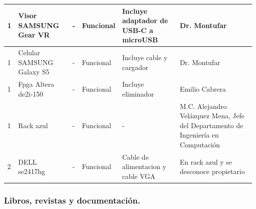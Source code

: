 \documentclass[a4paper,11pt]{article}                 %
\begin{document}
\begin{longtable}{|p{}|p{}|p{}|p{}|p{}|p{}|}
1                          & Visor SAMSUNG Gear VR                     & -                                                                            & Funcional                & Incluye adaptador de USB-C a microUSB                                      & Dr. Montufar                                                                      \\ \hline


1                          & Celular SAMSUNG Galaxy S5                 & -                                                                            & Funcional                & Incluye cable y cargador                                                   & Dr. Montufar                                                                      \\ \hline
1                          & Fpga Altera de2i-150                      & -                                                                            & Funcional                & Incluye eliminador                                                         & Emilio Cabrera                                                                    \\ \hline
1                          & Rack azul                                 & -                                                                            & Funcional                & -                                                                 & M.C. Alejandro Velázquez Mena, Jefe del Departamento de Ingeniería en Computación \\ \hline
2                          & DELL se2417hg                             & -                                                                            & Funcional                & Cable de alimentacion y cable VGA                                          & En rack azul y se desconoce propietario                                            \\ \hline

\end{longtable}

  \subsubsection{Libros, revistas y documentación.}
  
\end{document}
